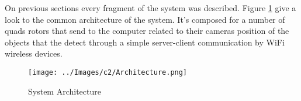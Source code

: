 On previous sections every fragment of the system was described. Figure \ref{fig:System_Architecture} give a look to the common architecture of the system. It's composed for a number of quads rotors that send to the computer related to their cameras position of the objects that the detect through a simple server-client communication by WiFi wireless devices.


\begin{figure}[hb]
	\centering
	\texttt{[image: ../Images/c2/Architecture.png]}
	\caption{System Architecture}
	\label{fig:System_Architecture}
\end{figure}

